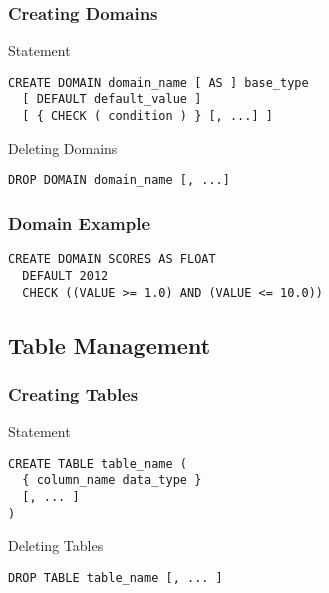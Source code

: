 \documentclass[dvipsnames]{beamer}
\theoremstyle{plain}
\begin{document}
\begin{frame}[fragile]
  \frametitle{Creating Domains}

  \begin{block}{Statement}
    \begin{lstlisting}
CREATE DOMAIN domain_name [ AS ] base_type
  [ DEFAULT default_value ]
  [ { CHECK ( condition ) } [, ...] ]
    \end{lstlisting}
  \end{block}

  \pause
  \medskip
  \begin{block}{Deleting Domains}
    \begin{lstlisting}
DROP DOMAIN domain_name [, ...]
    \end{lstlisting}
  \end{block}
\end{frame}

\begin{frame}[fragile]
  \frametitle{Domain Example}

  \begin{example}
    \begin{lstlisting}
CREATE DOMAIN SCORES AS FLOAT
  DEFAULT 2012
  CHECK ((VALUE >= 1.0) AND (VALUE <= 10.0))
    \end{lstlisting}
  \end{example}
\end{frame}

\subsection{Table Management}

\begin{frame}[fragile]
  \frametitle{Creating Tables}

  \begin{block}{Statement}
    \begin{lstlisting}
CREATE TABLE table_name (
  { column_name data_type }
  [, ... ]
)
    \end{lstlisting}
  \end{block}

  \pause
  \medskip
  \begin{block}{Deleting Tables}
    \begin{lstlisting}
DROP TABLE table_name [, ... ]
    \end{lstlisting}
  \end{block}
\end{frame}
\end{document}
